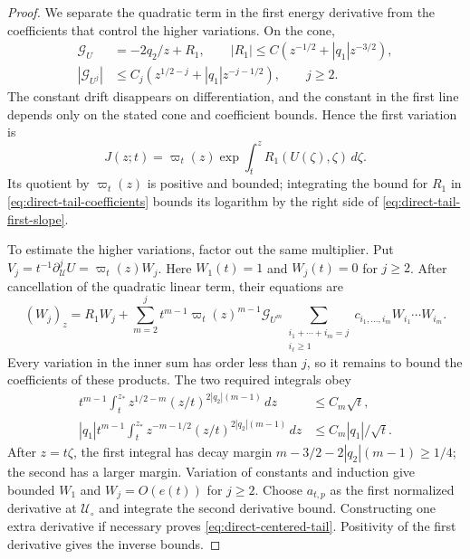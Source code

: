 \begin{proof}
We separate the quadratic term in the first energy derivative from the
coefficients that control the higher variations. On the cone,
\begin{align}
\label{eq:direct-tail-coefficients}
 \mathcal G_U&=-2q_2/z+R_1,\qquad
 |R_1|\le C(z^{-1/2}+|q_1|z^{-3/2}),\\
 |\mathcal G_{U^j}|&\le C_j(z^{1/2-j}+|q_1|z^{-j-1/2}),
 \qquad j\ge2.\nonumber
\end{align}
The constant drift disappears on differentiation, and the constant in
the first line depends only on the stated cone and coefficient bounds.
Hence the first variation is
\begin{equation}
\label{eq:direct-tail-variation}
 J(z;t)=\varpi_t(z)
     \exp\int_t^z R_1(U(\zeta),\zeta)\,d\zeta .
\end{equation}
Its quotient by \(\varpi_t(z)\) is positive and bounded; integrating the
bound for \(R_1\) in \eqref{eq:direct-tail-coefficients} bounds its
logarithm by the right side of \eqref{eq:direct-tail-first-slope}.

To estimate the higher variations, factor out the same multiplier. Put
\(V_j=t^{-1}\partial_{\mathcal U}^jU=\varpi_t(z)W_j\).
Here \(W_1(t)=1\) and \(W_j(t)=0\) for \(j\ge2\).
After cancellation of the quadratic linear term, their equations are
\[
 (W_j)_z=R_1W_j+
 \sum_{m=2}^j t^{m-1}\varpi_t(z)^{m-1}\mathcal G_{U^m}
 \sum_{\substack{i_1+\cdots+i_m=j\\i_\ell\ge1}}
       c_{i_1,\ldots,i_m}W_{i_1}\cdots W_{i_m}.
\]
Every variation in the inner sum has order less than \(j\), so it remains
to bound the coefficients of these products. The two required integrals obey
\begin{align}
\label{eq:direct-weighted-integrals}
 t^{m-1}\int_t^{z_*}z^{1/2-m}(z/t)^{2|q_2|(m-1)}\,dz
       &\le C_m\sqrt t,\\
 |q_1|t^{m-1}\int_t^{z_*}z^{-m-1/2}
                       (z/t)^{2|q_2|(m-1)}\,dz
       &\le C_m|q_1|/\sqrt t.\nonumber
\end{align}
After \(z=t\zeta\), the first integral has decay margin
\(m-3/2-2|q_2|(m-1)\ge1/4\); the second has a larger margin.
Variation of constants and induction give bounded \(W_1\) and
\(W_j=O(e(t))\) for \(j\ge2\). Choose \(a_{t,p}\) as the first
normalized derivative at \(\mathcal U_\circ\) and integrate the second
derivative bound. Constructing one extra derivative if necessary
proves \eqref{eq:direct-centered-tail}. Positivity of the first
derivative gives the inverse bounds.


\end{proof}
